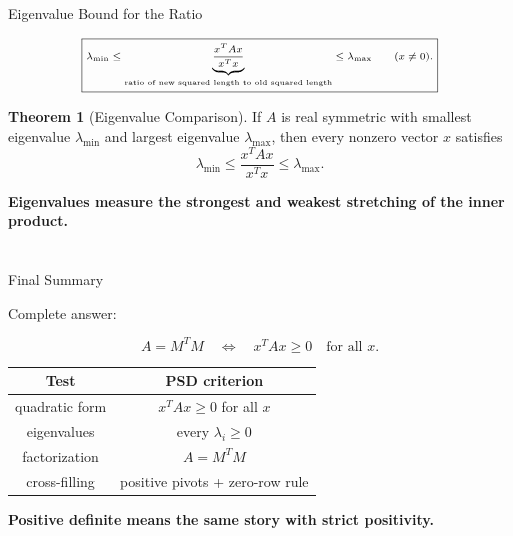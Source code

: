 \documentclass[10pt]{beamer}
\theoremstyle{definition}
\newtheorem{thm}{Theorem}[section]
\newcommand{\x}[1]{\alert{\textbf{#1}}}
\begin{document}
\begin{frame}{Eigenvalue Bound for the Ratio}

\[
\scriptsize
\boxed{
\lambda_{\min}
\le
\underbrace{\frac{x^TAx}{x^Tx}}_{\text{ratio of new squared length to old squared length}}
\le
\lambda_{\max}
\qquad(x\ne0).
}
\]

\vfill

\begin{thm}[Eigenvalue Comparison]
If $A$ is real symmetric with smallest eigenvalue $\lambda_{\min}$ and
largest eigenvalue $\lambda_{\max}$, then every nonzero vector $x$ satisfies
$$
\boxed{
\lambda_{\min}
\le
\frac{x^TAx}{x^Tx}
\le
\lambda_{\max}.
}
$$
\end{thm}

\vfill

\begin{center}
\x{Eigenvalues measure the strongest and weakest stretching of the inner product.}
\end{center}

\end{frame}


\section*{}

\begin{frame}{Final Summary}

Complete answer:

$$
A=M^TM
\quad\Longleftrightarrow\quad
x^TAx\ge0\quad\text{for all }x.
$$

\vspace{0.05cm}

\begin{center}
\small
\renewcommand{\arraystretch}{1.12}
\begin{tabular}{c|c}
\textbf{Test} & \textbf{PSD criterion}\\
\hline
quadratic form & $x^TAx\ge0$ for all $x$\\
eigenvalues & every $\lambda_i\ge0$\\
factorization & $A=M^TM$\\
cross-filling & positive pivots + zero-row rule
\end{tabular}
\end{center}

\vfill

\begin{center}
\x{Positive definite means the same story with strict positivity.}
\end{center}

\end{frame}
\end{document}
